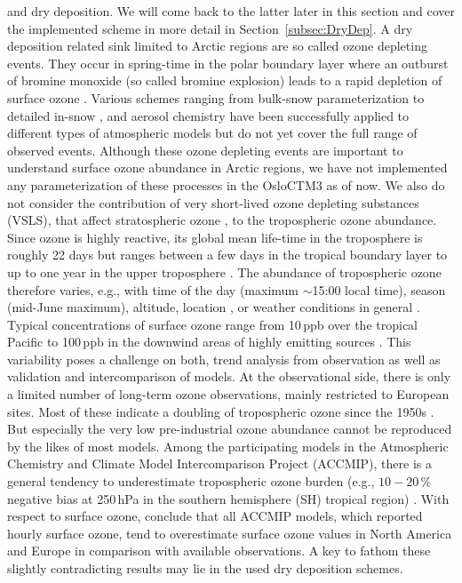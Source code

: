 \documentclass[gmd, manuscript]{copernicus}
\begin{document}
and dry deposition. We will come back to the latter later in this section and cover the implemented scheme in more detail in Section~\ref{subsec:DryDep}. A dry deposition related sink limited to Arctic regions are so called ozone depleting events. They occur in spring-time in the polar boundary layer where an outburst of bromine monoxide  (so called bromine explosion) leads to a rapid depletion of surface ozone \citep{JGR:Oltmans1981,GRL:Bottenheim1986,Nat:Barrie1988,JGR:Bottenheim2006}. Various schemes ranging from bulk-snow parameterization \citep{ACP:Toyota2011,GMD:Falk2018} to detailed in-snow \citep{ACP:Toyota2014a}, and aerosol chemistry \citep{ACP:Yang2010} have been successfully applied to different types of atmospheric models but do not yet cover the full range of observed events. Although these ozone depleting events are important to understand surface ozone abundance in Arctic regions, we have not implemented any parameterization of these processes in the OsloCTM3 as of now. We also do not consider the contribution of very short-lived ozone depleting substances (VSLS), that affect stratospheric ozone \citep{JGR:Warwick2006, ACP:Ziska2013, ACP:Hossaini2016, ACP:Falk2017}, to the tropospheric ozone abundance.\\
Since ozone is highly reactive, its global mean life-time in the troposphere is roughly 22 days but ranges between a few days in the tropical boundary layer to up to one year in the upper troposphere \citep{JGR:Stevenson2005,ACP:Young2013}. The abundance of tropospheric ozone therefore varies, e.g., with time of the day (maximum $\sim$15:00 local time), season (mid-June maximum), altitude, location \citep{ACP:Schnell2015}, or weather conditions in general \citep{ACP:Otero2018}. Typical concentrations of surface ozone range from 10\,\unit{ppb} over the tropical Pacific to 100\,\unit{ppb} in the downwind areas of highly emitting sources \citep[Chapter 8]{IPCC2013}. This variability poses a challenge on both, trend analysis from observation as well as validation and intercomparison of models. At the observational side, there is only a limited number of long-term ozone observations, mainly restricted to European sites. Most of these indicate a doubling of tropospheric ozone since the 1950s \citep[Chapter 2]{IPCC2013}. But especially the very low pre-industrial ozone abundance cannot be reproduced by the likes of most models. Among the participating models in the Atmospheric Chemistry and Climate Model Intercomparison Project (ACCMIP), there is a general tendency to underestimate tropospheric ozone burden (e.g., $10-20$\,\unit{\%} negative bias at 250\,\unit{hPa} in the southern hemisphere (SH) tropical region) \citep[Chapter 8]{IPCC2013}. With respect to surface ozone, \citet{ACP:Schnell2015} conclude that all ACCMIP models, which reported hourly surface ozone, tend to overestimate surface ozone values in North America and Europe in comparison with available observations. A key to fathom these slightly contradicting results may lie in the used dry deposition schemes.\\
\end{document}

